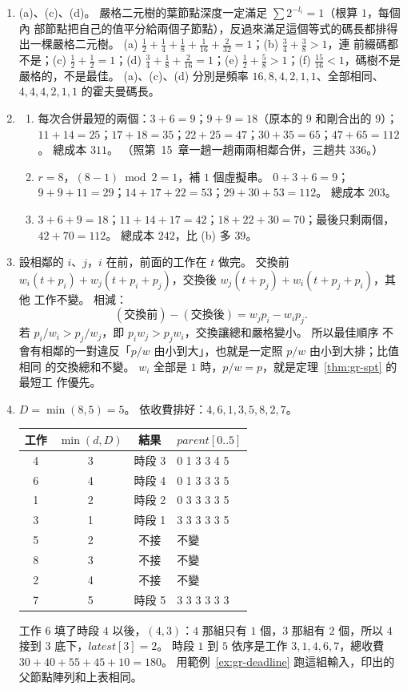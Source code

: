 \begin{enumerate}
\item (a)、(c)、(d)。 嚴格二元樹的葉節點深度一定滿足 $\sum 2^{-l_i} = 1$（根算 $1$，每個內
部節點把自己的值平分給兩個子節點），反過來滿足這個等式的碼長都排得出一棵嚴格二元樹。 (a)
$\frac12 + \frac14 + \frac18 + \frac1{16} + \frac2{32} = 1$；(b) $\frac34 + \frac38 > 1$，連
前綴碼都不是；(c) $\frac12 + \frac12 = 1$；(d) $\frac34 + \frac18 + \frac2{16} = 1$；(e)
$\frac12 + \frac58 > 1$；(f) $\frac{15}{16} < 1$，碼樹不是嚴格的，不是最佳。 (a)、(c)、(d)
分別是頻率 $16, 8, 4, 2, 1, 1$、全部相同、$4, 4, 4, 2, 1, 1$ 的霍夫曼碼長。

\item
\begin{enumerate}
\item 每次合併最短的兩個：$3 + 6 = 9$；$9 + 9 = 18$（原本的 $9$ 和剛合出的 $9$）；
$11 + 14 = 25$；$17 + 18 = 35$；$22 + 25 = 47$；$30 + 35 = 65$；$47 + 65 = 112$。
總成本 $311$。 （照第~15~章一趟一趟兩兩相鄰合併，三趟共 $336$。）
\item $r = 8$，$(8 - 1) \bmod 2 = 1$，補 $1$ 個虛擬串。 $0 + 3 + 6 = 9$；
$9 + 9 + 11 = 29$；$14 + 17 + 22 = 53$；$29 + 30 + 53 = 112$。 總成本 $203$。
\item $3 + 6 + 9 = 18$；$11 + 14 + 17 = 42$；$18 + 22 + 30 = 70$；最後只剩兩個，
$42 + 70 = 112$。 總成本 $242$，比 (b) 多 $39$。
\end{enumerate}

\item 設相鄰的 $i$、$j$，$i$ 在前，前面的工作在 $t$ 做完。 交換前
$w_i(t + p_i) + w_j(t + p_i + p_j)$，交換後 $w_j(t + p_j) + w_i(t + p_j + p_i)$，其他
工作不變。 相減：
\[
(\text{交換前}) - (\text{交換後}) = w_j p_i - w_i p_j .
\]
若 $p_i / w_i > p_j / w_j$，即 $p_i w_j > p_j w_i$，交換讓總和嚴格變小。 所以最佳順序
不會有相鄰的一對違反「$p / w$ 由小到大」，也就是一定照 $p / w$ 由小到大排；比值相同
的交換總和不變。 $w_i$ 全部是 $1$ 時，$p / w = p$，就是定理~\ref{thm:gr-spt} 的最短工
作優先。

\item $D = \min(8, 5) = 5$。 依收費排好：$4, 6, 1, 3, 5, 8, 2, 7$。
\begin{center}
\begin{tabular}{cccl}
\toprule
工作 & $\min(d, D)$ & 結果 & $\mathit{parent}[0..5]$ \\
\midrule
4 & 3 & 時段 3 & 0 1 3 3 4 5 \\
6 & 4 & 時段 4 & 0 1 3 3 3 5 \\
1 & 2 & 時段 2 & 0 3 3 3 3 5 \\
3 & 1 & 時段 1 & 3 3 3 3 3 5 \\
5 & 2 & 不接 & 不變 \\
8 & 3 & 不接 & 不變 \\
2 & 4 & 不接 & 不變 \\
7 & 5 & 時段 5 & 3 3 3 3 3 3 \\
\bottomrule
\end{tabular}
\end{center}
工作 6 填了時段 $4$ 以後，$(4, 3)$：$4$ 那組只有 $1$ 個，$3$ 那組有 $2$
個，所以 $4$ 接到 $3$ 底下，$\mathit{latest}[3] = 2$。 時段 $1$ 到 $5$ 依序是工作
$3, 1, 4, 6, 7$，總收費 $30 + 40 + 55 + 45 + 10 = 180$。 用範例~\ref{ex:gr-deadline}
跑這組輸入，印出的父節點陣列和上表相同。


\end{enumerate}
